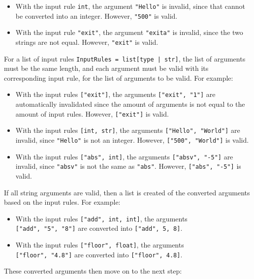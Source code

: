 \documentclass{article}
\begin{document}
				\begin{itemize}
					\item With the input rule \verb|int|, the argument \verb|"Hello"| is invalid,
					since that cannot be converted into an integer. However, \verb|"500"| is
					valid.
					\item With the input rule \verb|"exit"|, the argument \verb|"exita"| is invalid,
					since the two strings are not equal. However, \verb|"exit"| is valid.
				\end{itemize}

				For a list of input rules \verb+InputRules = list[type | str]+, the list of
				arguments must be the same length, and each argument must be valid with its
				corresponding input rule, for the list of arguments to be valid. For example:

				\begin{itemize}
					\item With the input rules \verb|["exit"]|, the arguments \verb|["exit", "1"]| are
					automatically invalidated since the amount of arguments is not equal to the amount
					of input rules. However, \verb|["exit"]| is valid.
					\item With the input rules \verb|[int, str]|, the arguments \verb|["Hello", "World"]|
					are invalid, since \verb|"Hello"| is not an integer. However, \verb|["500", "World"]|
					is valid.
					\item With the input rules \verb|["abs", int]|, the arguments \verb|["absv", "-5"]|
					are invalid, since \verb|"absv"| is not the same as \verb|"abs"|. However,
					\verb|["abs", "-5"]| is valid.
				\end{itemize}

				If all string arguments are valid, then a list is created of the converted arguments based
				on the input rules. For example:

				\begin{itemize}
					\item With the input rules \verb|["add", int, int]|, the arguments \\
					\verb|["add", "5", "8"]| are converted into \verb|["add", 5, 8]|.
					\item With the input rules \verb|["floor", float]|, the arguments \\
					\verb|["floor", "4.8"]| are converted into \verb|["floor", 4.8]|.
				\end{itemize}

				These converted arguments then move on to the next step:
\end{document}
